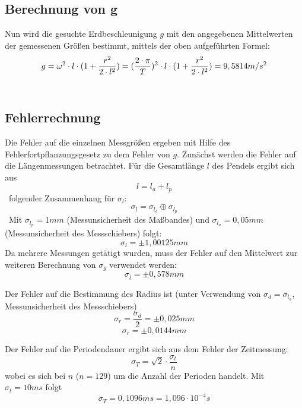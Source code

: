 \documentclass[a4paper, 11pt]{article}
\begin{document}
\subsection{Berechnung von g}
Nun wird die gesuchte Erdbeschleunigung $g$ mit den angegebenen Mittelwerten der gemessenen Größen bestimmt, mittels der oben aufgeführten Formel:
\begin{equation*}
g = \omega^2 \cdot l \cdot (1+\frac{r^2}{2 \cdot l^2})   \\  
= (\frac{2\cdot \pi}{T}) ^2 \cdot l \cdot (1+\frac{r^2}{2 \cdot l^2}) = 9,5814 m/s^2
\end{equation*}\

\subsection{Fehlerrechnung}
Die Fehler auf die einzelnen Messgrößen ergeben mit Hilfe des Fehlerfortpflanzungsgesetz zu dem Fehler von $g$.
Zunächst werden die Fehler auf die Längenmessungen betrachtet.
Für die Gesamtlänge $l$ des Pendels ergibt sich aus \begin{equation*}
l = l_a + l_p
\end{equation*}\
folgender Zusammenhang für $\sigma_l $:
\\
\begin{equation*}
\sigma_l = \sigma_{l_a} \oplus \sigma_{l_p}
\end{equation*}\
Mit $\sigma_{l_p}=1mm$ (Messunsicherheit des Maßbandes) und $\sigma_{l_a}=0,05mm$ (Messunsicherheit des Messschiebers) folgt:
\begin{equation*}
\sigma_l = \pm1,00125mm
\end{equation*}
Da mehrere Messungen getätigt wurden, muss der Fehler auf den Mittelwert zur weiteren Berechnung von $\sigma_g$ verwendet werden:
\begin{equation*}
\sigma_{\overline{l}} = \pm0,578mm
\end{equation*}

Der Fehler auf die Bestimmung des Radius ist (unter Verwendung von $\sigma_d=\sigma_{l_a}$, Messunsicherheit des Messschiebers)
\begin{equation*}
\sigma_r = \frac{\sigma_d}{2} = \pm0,025 mm
\end{equation*}
\begin{equation*}
\sigma_{\overline{r}} = \pm0,0144mm
\end{equation*}

Der Fehler auf die Periodendauer ergibt sich aus dem Fehler der Zeitmessung:
\begin{equation*}
\sigma_T = \sqrt{2} \cdot \frac{\sigma_t }{n}
\end{equation*}
wobei es sich bei $n$ ($n=129$) um die Anzahl der Perioden handelt. Mit $\sigma_t = 10 ms $ folgt
\begin{equation*}
\sigma_T = 0,1096ms = 1,096 \cdot 10^{-4} s
\end{equation*}
\end{document}
